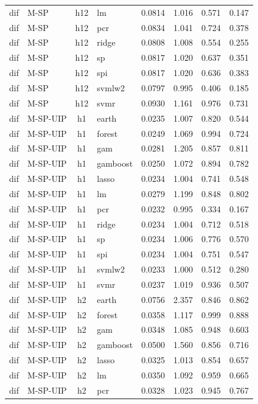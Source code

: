 \begin{ThreePartTable}
\begin{longtable}[t]{llclcccc}
dif & M-SP & h12 & lm & 0.0814 & 1.016 & 0.571 & 0.147\\
dif & M-SP & h12 & pcr & 0.0834 & 1.041 & 0.724 & 0.378\\
dif & M-SP & h12 & ridge & 0.0808 & 1.008 & 0.554 & 0.255\\
dif & M-SP & h12 & sp & 0.0817 & 1.020 & 0.637 & 0.351\\
dif & M-SP & h12 & spi & 0.0817 & 1.020 & 0.636 & 0.383\\
dif & M-SP & h12 & svmlw2 & 0.0797 & 0.995 & 0.406 & 0.185\\
dif & M-SP & h12 & svmr & 0.0930 & 1.161 & 0.976 & 0.731\\
\addlinespace
dif & M-SP-UIP & h1 & earth & 0.0235 & 1.007 & 0.820 & 0.544\\
dif & M-SP-UIP & h1 & forest & 0.0249 & 1.069 & 0.994 & 0.724\\
dif & M-SP-UIP & h1 & gam & 0.0281 & 1.205 & 0.857 & 0.811\\
dif & M-SP-UIP & h1 & gamboost & 0.0250 & 1.072 & 0.894 & 0.782\\
dif & M-SP-UIP & h1 & lasso & 0.0234 & 1.004 & 0.741 & 0.548\\
dif & M-SP-UIP & h1 & lm & 0.0279 & 1.199 & 0.848 & 0.802\\
dif & M-SP-UIP & h1 & pcr & 0.0232 & 0.995 & 0.334 & 0.167\\
dif & M-SP-UIP & h1 & ridge & 0.0234 & 1.004 & 0.712 & 0.518\\
dif & M-SP-UIP & h1 & sp & 0.0234 & 1.006 & 0.776 & 0.570\\
dif & M-SP-UIP & h1 & spi & 0.0234 & 1.004 & 0.751 & 0.547\\
dif & M-SP-UIP & h1 & svmlw2 & 0.0233 & 1.000 & 0.512 & 0.280\\
dif & M-SP-UIP & h1 & svmr & 0.0237 & 1.019 & 0.936 & 0.507\\
\addlinespace
dif & M-SP-UIP & h2 & earth & 0.0756 & 2.357 & 0.846 & 0.862\\
dif & M-SP-UIP & h2 & forest & 0.0358 & 1.117 & 0.999 & 0.888\\
dif & M-SP-UIP & h2 & gam & 0.0348 & 1.085 & 0.948 & 0.603\\
dif & M-SP-UIP & h2 & gamboost & 0.0500 & 1.560 & 0.856 & 0.716\\
dif & M-SP-UIP & h2 & lasso & 0.0325 & 1.013 & 0.854 & 0.657\\
dif & M-SP-UIP & h2 & lm & 0.0350 & 1.092 & 0.959 & 0.665\\
dif & M-SP-UIP & h2 & pcr & 0.0328 & 1.023 & 0.945 & 0.767\\

\end{longtable}
\end{ThreePartTable}
